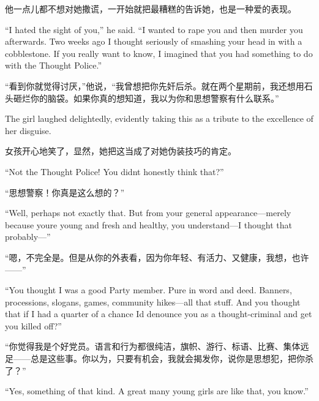 \begin{paracol}{2}
\switchcolumn

他一点儿都不想对她撒谎，一开始就把最糟糕的告诉她，也是一种爱的表现。

\switchcolumn*

``I hated the sight of you,'' he said. ``I wanted to rape you and then
murder you afterwards. Two weeks ago I thought seriously of smashing
your head in with a cobblestone. If you really want to know, I imagined
that you had something to do with the Thought Police.''

\switchcolumn

``看到你就觉得讨厌，''他说，``我曾想把你先奸后杀。就在两个星期前，我还想用石头砸烂你的脑袋。如果你真的想知道，我以为你和思想警察有什么联系。''

\switchcolumn*

The girl laughed delightedly, evidently taking this as a tribute to the
excellence of her disguise.

\switchcolumn

女孩开心地笑了，显然，她把这当成了对她伪装技巧的肯定。

\switchcolumn*

``Not the Thought Police! You didn\textquotesingle t honestly think
that?''

\switchcolumn

``思想警察！你真是这么想的？''

\switchcolumn*

``Well, perhaps not exactly that. But from your general
appearance---merely because you\textquotesingle re young and fresh and
healthy, you understand---I thought that probably---''

\switchcolumn

``嗯，不完全是。但是从你的外表看，因为你年轻、有活力、又健康，我想，也许——''

\switchcolumn*

``You thought I was a good Party member. Pure in word and deed. Banners,
processions, slogans, games, community hikes---all that stuff. And you
thought that if I had a quarter of a chance I\textquotesingle d denounce
you as a thought-criminal and get you killed off?''

\switchcolumn

``你觉得我是个好党员。语言和行为都很纯洁，旗帜、游行、标语、比赛、集体远足——总是这些事。你以为，只要有机会，我就会揭发你，说你是思想犯，把你杀了？''

\switchcolumn*

``Yes, something of that kind. A great many young girls are like that,
you know.''


\end{paracol}
